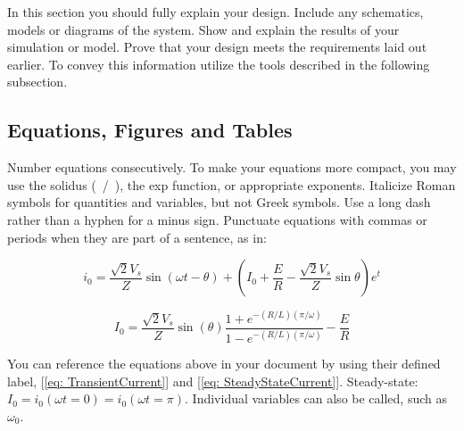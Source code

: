 In this section you should fully explain your design. Include any schematics, models or diagrams of the system. Show and explain the results of your simulation or model. Prove that your design meets the requirements laid out earlier. To convey this information utilize the tools described in the following subsection.











\subsection{Equations, Figures and Tables}

Number equations consecutively. To make your  equations more compact, you may use the solidus (~/~), the exp function, or  appropriate exponents. Italicize Roman symbols for quantities and variables, 
but not Greek symbols. Use a long dash rather than a hyphen for a minus  sign. Punctuate equations with commas or periods when they are part of a sentence, as in:

\begin{equation} \label{eq: TransientCurrent}
	i_0 = \frac{\sqrt{2}V_s}{Z}\sin(\omega t-\theta) + \left(I_0 + \frac{E}{R} - \frac{\sqrt{2}V_s}{Z}\sin\theta \right) e^{t}
\end{equation}

\begin{equation} \label{eq: SteadyStateCurrent}
	I_0 = \frac{\sqrt{2}V_s}{Z}\sin(\theta)\frac{1+e^{-(R/L)(\pi/\omega)}}{1-e^{-(R/L)(\pi/\omega)}} - \frac{E}{R}
\end{equation}


You can reference the equations above in your document by using their defined label, [\ref{eq: TransientCurrent}] and [\ref{eq: SteadyStateCurrent}]. Steady-state: $I_0= i_0(\omega t =0) = i_0(\omega t = \pi)$. Individual variables can also be called, such as $\omega_0$. 




